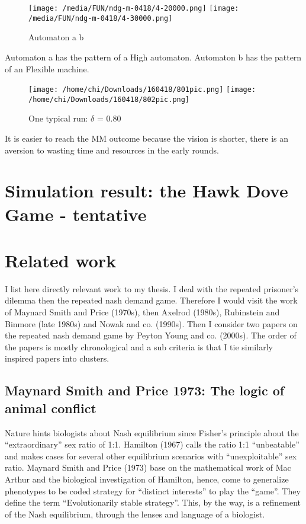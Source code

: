 \documentclass[12.5pt]{report}
\begin{document}
\begin{figure}
\center
\texttt{[image: /media/FUN/ndg-m-0418/4-20000.png]}
\texttt{[image: /media/FUN/ndg-m-0418/4-30000.png]}
\caption{Automaton a b}
\end{figure}

Automaton a has the pattern of a High automaton. Automaton b has the pattern of an Flexible machine.



\begin{figure}
\texttt{[image: /home/chi/Downloads/160418/801pic.png]}
\texttt{[image: /home/chi/Downloads/160418/802pic.png]}

\caption{One typical run: $\delta$ = 0.80}
\end{figure}

It is easier to reach the MM outcome because the vision is shorter, there is an aversion to wasting time and resources in the early rounds.

\chapter{Simulation result: the Hawk Dove Game - tentative}


\chapter{Related work}
I list here directly relevant work to my thesis. I deal with the repeated prisoner’s dilemma then the repeated nash demand game. Therefore I would visit the work of Maynard Smith and Price (1970s), then Axelrod (1980s), Rubinstein and Binmore (late 1980s) and Nowak and co. (1990s). Then I consider two papers on the repeated nash demand game by Peyton Young and co. (2000s). The order of the papers is mostly chronological and a sub criteria is that I tie similarly inspired papers into clusters.

\section{Maynard Smith and Price 1973: The logic of animal conflict}

Nature hints biologists about Nash equilibrium since Fisher’s principle about the “extraordinary” sex ratio of 1:1. Hamilton (1967) calls the ratio 1:1 “unbeatable” and makes cases for several other equilibrium scenarios with “unexploitable” sex ratio. Maynard Smith and Price (1973) base on the mathematical work of Mac Arthur and the biological investigation of Hamilton, hence, come to generalize phenotypes to be coded strategy for “distinct interests” to play the “game”. They define the term “Evolutionarily stable strategy”. This, by the way, is a refinement of the Nash equilibrium, through the lenses and language of a biologist.\\
\end{document}
